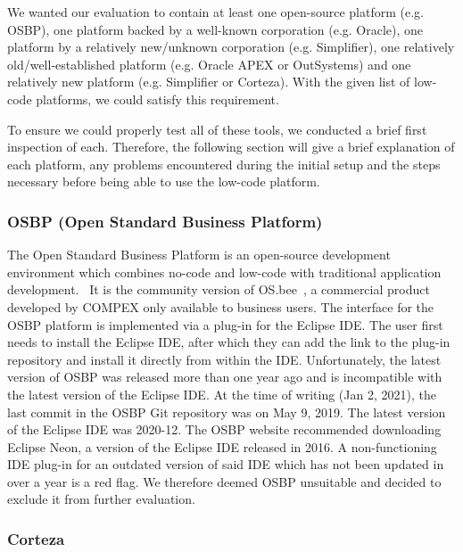 \documentclass[runningheads]{llncs}
\begin{document}
We wanted our evaluation to contain at least one open-source platform (e.g. OSBP), one platform backed by a well-known corporation (e.g. Oracle), one platform by a relatively new/unknown corporation (e.g. Simplifier), one relatively old/well-established platform (e.g. Oracle APEX or OutSystems) and one relatively new platform (e.g. Simplifier or Corteza). With the given list of low-code platforms, we could satisfy this requirement.

To ensure we could properly test all of these tools, we conducted a brief first inspection of each. Therefore, the following section will give a brief explanation of each platform, any problems encountered during the initial setup and the steps necessary before being able to use the low-code platform.

\subsubsection{OSBP (Open Standard Business Platform)}

The Open Standard Business Platform is an open-source development environment which combines no-code and low-code with traditional application development.~\cite{osbp} It is the community version of OS.bee~\cite{osbee}, a commercial product developed by COMPEX only available to business users. The interface for the OSBP platform is implemented via a plug-in for the Eclipse IDE. The user first needs to install the Eclipse IDE, after which they can add the link to the plug-in repository and install it directly from within the IDE. Unfortunately, the latest version of OSBP was released more than one year ago and is incompatible with the latest version of the Eclipse IDE. At the time of writing (Jan 2, 2021), the last commit in the OSBP Git repository was on May 9, 2019. The latest version of the Eclipse IDE was 2020-12. The OSBP website recommended downloading Eclipse Neon, a version of the Eclipse IDE released in 2016. A non-functioning IDE plug-in for an outdated version of said IDE which has not been updated in over a year is a red flag. We therefore deemed OSBP unsuitable and decided to exclude it from further evaluation.

\subsubsection{Corteza}
\end{document}
